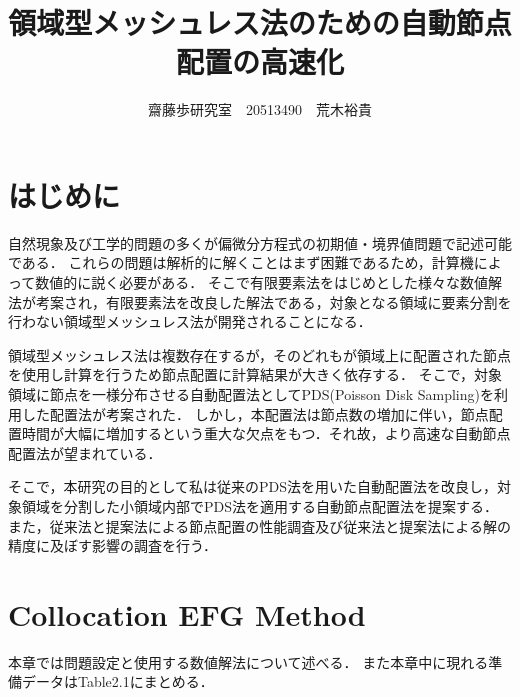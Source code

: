 \documentclass[twocolumn,head_space=15.0mm,foot_space=15.0mm,fleqn]{jlreq}
\numberwithin{equation}{section}
\begin{document}
\title{領域型メッシュレス法のための自動節点配置の高速化}
\author{齋藤歩研究室　20513490　荒木裕貴}
\maketitle

\section{はじめに}
自然現象及び工学的問題の多くが偏微分方程式の初期値・境界値問題で記述可能である．
これらの問題は解析的に解くことはまず困難であるため，計算機によって数値的に説く必要がある．
そこで有限要素法をはじめとした様々な数値解法が考案され，有限要素法を改良した解法である，対象となる領域に要素分割を行わない領域型メッシュレス法が開発されることになる．

領域型メッシュレス法は複数存在するが，そのどれもが領域上に配置された節点を使用し計算を行うため節点配置に計算結果が大きく依存する．
そこで，対象領域に節点を一様分布させる自動配置法としてPDS(Poisson Disk Sampling)を利用した配置法が考案された．
しかし，本配置法は節点数の増加に伴い，節点配置時間が大幅に増加するという重大な欠点をもつ．それ故，より高速な自動節点配置法が望まれている．

そこで，本研究の目的として私は従来のPDS法を用いた自動配置法を改良し，対象領域を分割した小領域内部でPDS法を適用する自動節点配置法を提案する．
また，従来法と提案法による節点配置の性能調査及び従来法と提案法による解の精度に及ぼす影響の調査を行う．

\section{Collocation EFG Method}
本章では問題設定と使用する数値解法について述べる．
また本章中に現れる準備データはTable2.1にまとめる．
\end{document}
